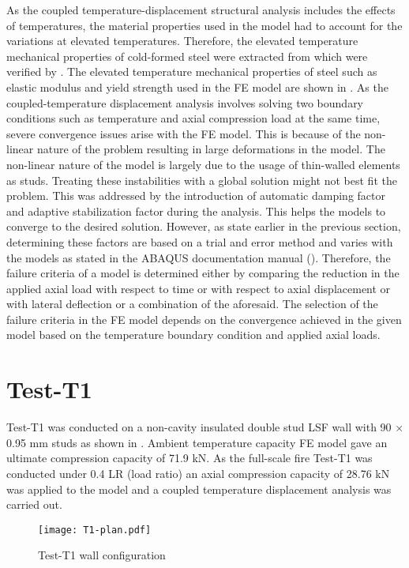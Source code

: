 As the coupled temperature-displacement structural analysis includes the effects of temperatures, the material properties used in the model had to account for the variations at elevated temperatures. Therefore, the elevated temperature mechanical properties of cold-formed steel were extracted from \citet{Kankanamge2011} which were verified by \citet{Rokilan2019}. The elevated temperature mechanical properties of steel such as elastic modulus and yield strength used in the FE model are shown in . As the coupled-temperature displacement analysis involves solving two boundary conditions such as temperature and axial compression load at the same time, severe convergence issues arise with the FE model. This is because of the non-linear nature of the problem resulting in large deformations in the model. The non-linear nature of the model is largely due to the usage of thin-walled elements as studs. Treating these instabilities with a global solution might not best fit the problem. This was addressed by the introduction of automatic damping factor and adaptive stabilization factor during the analysis. This helps the models to converge to the desired solution. However, as state earlier in the previous section, determining these factors are based on a trial and error method and varies with the models as stated in the ABAQUS documentation manual (\cite{abaqus2017}). Therefore, the failure criteria of a model is determined either by comparing the reduction in the applied axial load with respect to time or with respect to axial displacement or with lateral deflection or a combination of the aforesaid. The selection of the failure criteria in the FE model depends on the convergence achieved in the given model based on the temperature boundary condition and applied axial loads. 

\section*{Test-T1}

Test-T1 was conducted on a non-cavity insulated double stud LSF wall with 90 $\times$ 0.95 mm studs as shown in . Ambient temperature capacity FE model gave an ultimate compression capacity of 71.9 kN. As the full-scale fire Test-T1 was conducted under 0.4 LR (load ratio) an axial compression capacity of 28.76 kN was applied to the model and a coupled temperature displacement analysis was carried out. 
\begin{figure}[!htbp]
	\centering
			\texttt{[image: T1-plan.pdf]}\\
		\caption{Test-T1 wall configuration}
		\label{fig:T1-plan-FEA}
\end{figure}

